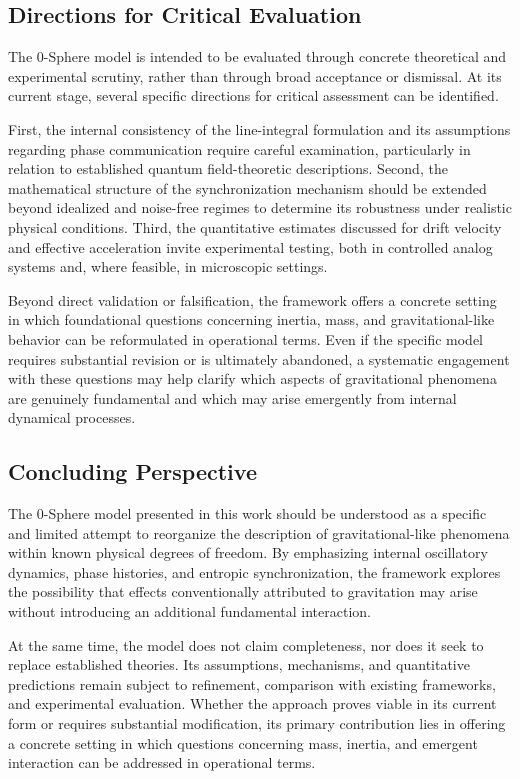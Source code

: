 \documentclass[12pt,letterpaper]{article}
\begin{document}
\subsection{Directions for Critical Evaluation}
\label{subsec:critical_evaluation}

The 0-Sphere model is intended to be evaluated through concrete theoretical and experimental scrutiny, rather than through broad acceptance or dismissal. At its current stage, several specific directions for critical assessment can be identified.

First, the internal consistency of the line-integral formulation and its assumptions regarding phase communication require careful examination, particularly in relation to established quantum field-theoretic descriptions. Second, the mathematical structure of the synchronization mechanism should be extended beyond idealized and noise-free regimes to determine its robustness under realistic physical conditions. Third, the quantitative estimates discussed for drift velocity and effective acceleration invite experimental testing, both in controlled analog systems and, where feasible, in microscopic settings.

Beyond direct validation or falsification, the framework offers a concrete setting in which foundational questions concerning inertia, mass, and gravitational-like behavior can be reformulated in operational terms. Even if the specific model requires substantial revision or is ultimately abandoned, a systematic engagement with these questions may help clarify which aspects of gravitational phenomena are genuinely fundamental and which may arise emergently from internal dynamical processes.


\subsection{Concluding Perspective}
\label{subsec:concluding_perspective}

The 0-Sphere model presented in this work should be understood as a specific and limited attempt to reorganize the description of gravitational-like phenomena within known physical degrees of freedom. By emphasizing internal oscillatory dynamics, phase histories, and entropic synchronization, the framework explores the possibility that effects conventionally attributed to gravitation may arise without introducing an additional fundamental interaction.

At the same time, the model does not claim completeness, nor does it seek to replace established theories. Its assumptions, mechanisms, and quantitative predictions remain subject to refinement, comparison with existing frameworks, and experimental evaluation. Whether the approach proves viable in its current form or requires substantial modification, its primary contribution lies in offering a concrete setting in which questions concerning mass, inertia, and emergent interaction can be addressed in operational terms.
\end{document}
